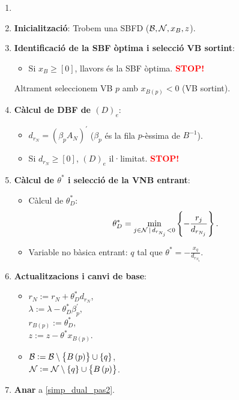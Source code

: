 \begin{alg}
    \begin{enumerate}
        \item[]
        \item {\bf Inicialització}: Trobem una SBFD ($\mathcal{B}, \mathcal{N}, x_B, z$).
        \item \label{simp_dual_pas2} {\bf Identificació de la SBF òptima i selecció VB sortint}:
            \begin{itemize}
                \item Si $x_B \geq \left[0\right]$, llavors és la SBF òptima. \textcolor{red}{\bf STOP!}
            \end{itemize}
            Altrament seleccionem VB $p$ amb $x_{B\left(p\right)} < 0$ (VB sortint).
        \item {\bf Càlcul de DBF de $\left(D\right)_e$}:
            \begin{itemize}
                \item $d_{r_N} = \left(\beta_p A_N\right)^\prime$ ($\beta_p$ és la fila $p$-èssima de $B^{-1}$).
                \item Si $d_{r_N} \geq \left[0\right]$, $\left(D\right)_e$ il·limitat. \textcolor{red}{\bf STOP!}
            \end{itemize}
        \item {\bf Càlcul de $\theta^*$ i selecció de la VNB entrant}:
            \begin{itemize}
                \item Càlcul de $\theta_D^*$: 
                    \[\theta_D^* = \min_{j \in \mathcal{N} \,|\, d_{r_{N_j}} < 0} \left\{-\frac{r_j}{d_{r_{N_j}}} \right\}.\]
                \item Variable no bàsica entrant: $q$ tal que $\theta^* = -\frac{x_q}{d_{r_{N_q}}}$.
            \end{itemize}
        \item {\bf Actualitzacions i canvi de base}:
            \begin{itemize}
                \item $r_N := r_N + \theta_D^* d_{r_N}$, \\
                    $\lambda := \lambda - \theta_D^* \beta_p^\prime$, \\
                    $r_{B\left(p\right)} := \theta_D^*$, \\
                    $z := z - \theta^* x_{B\left(p\right)}$.
                \item $\mathcal{B} := \mathcal{B} \setminus \left\{B\left(p\right)\right\} \cup \left\{q\right\}$, \\
                    $\mathcal{N} := \mathcal{N} \setminus \left\{q\right\} \cup \left\{B\left(p\right)\right\}$.
            \end{itemize}
        \item {\bf Anar} a \ref{simp_dual_pas2}.
    \end{enumerate}
\end{alg}
